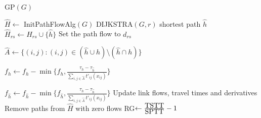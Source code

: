 \begin{algorithm}
\caption{GP$(G)$}
\label{alg:gp}
\begin{algorithmic}
\STATE $\hat{H}\leftarrow$ InitPathFlowAlg$(G)$
		\STATE DIJKSTRA$(G, r)$
			\STATE shortest path $\hat{h}$
				\STATE $\hat{H}_{rs}\leftarrow \hat{H}_{rs}\cup\{\hat{h}\}$
			\ENDIF
				\STATE Set the path flow to $d_{rs}$

			\ELSE
					\STATE $\hat{A}\leftarrow \{(i,j): (i,j)\in
					(\hat{h}\cup h)\setminus (\hat{h}\cap h)\}$

					\STATE $f_h\leftarrow f_h -
					\min\bigg\{f_h, \frac{\tau_h - \tau_{\hat{h}}}
					{\sum_{i,j\in \hat{A}} t'_{ij}(x_{ij})}\bigg\}$

					\STATE $f_{\hat{h}}\leftarrow f_{\hat{h}} -
					\min\bigg\{f_{\hat{h}}, \frac{\tau_h - \tau_{\hat{h}}}
					{\sum_{i,j\in \hat{A}} t'_{ij}(x_{ij})}\bigg\}$
				\ENDFOR
			\ENDIF
		\ENDFOR
		\STATE Update link flows, travel times and derivatives
	\ENDFOR
	\STATE Remove paths from $\hat{H}$ with zero flows
	\STATE RG$\leftarrow \frac{\hbox{TSTT}}{\hbox{SPTT}}-1$
\ENDWHILE
\end{algorithmic}
\end{algorithm}
